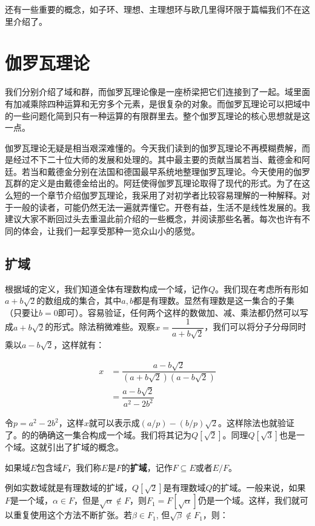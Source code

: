 \documentclass{article}
\begin{document}
还有一些重要的概念，如子环、理想、主理想环与欧几里得环限于篇幅我们不在这里介绍了。

\section{伽罗瓦理论}
我们分别介绍了域和群，而伽罗瓦理论像是一座桥梁把它们连接到了一起。域里面有加减乘除四种运算和无穷多个元素，是很复杂的对象。而伽罗瓦理论可以把域中的一些问题化简到只有一种运算的有限群里去。整个伽罗瓦理论的核心思想就是这一点。

伽罗瓦理论无疑是相当艰深难懂的。今天我们读到的伽罗瓦理论不再模糊费解，而是经过不下二十位大师的发展和处理的。其中最主要的贡献当属若当、戴德金和阿廷。若当和戴德金分别在法国和德国最早系统地整理伽罗瓦理论。今天使用的伽罗瓦群的定义是由戴德金给出的。阿廷使得伽罗瓦理论取得了现代的形式\cite{ZhangPu2013}。为了在这么短的一个章节介绍伽罗瓦理论，我采用了对初学者比较容易理解的一种解释\cite{Stillwell1994}。对于一般的读者，可能仍然无法一遍就弄懂它。开卷有益，生活不是线性发展的。我建议大家不断回过头去重温此前介绍的一些概念，并阅读那些名著。每次也许有不同的体会，让我们一起享受那种一览众山小的感觉。

\subsection{扩域}
根据域的定义，我们知道全体有理数构成一个域，记作$Q$。我们现在考虑所有形如$a + b\sqrt{2}$的数组成的集合，其中$a, b$都是有理数\cite{Goodman2011}。显然有理数是这一集合的子集（只要让$b=0$即可）。容易验证，任何两个这样的数做加、减、乘法都仍然可以写成$a + b \sqrt{2}$的形式。除法稍微难些。观察$x = \dfrac{1}{a + b\sqrt{2}}$，我们可以将分子分母同时乘以$a - b \sqrt{2}$，这样就有：

\[
\begin{array}{rl}
x & = \dfrac{a - b \sqrt{2}}{(a + b \sqrt{2})(a - b \sqrt{2})} \\[2ex]
  & = \dfrac{a - b \sqrt{2}}{a^2 - 2b^2}
\end{array}
\]

令$p = a^2 - 2b^2$，这样$x$就可以表示成$(a/p) -(b/p)\sqrt{2}$。这样除法也就验证了。的的确确这一集合构成一个域。我们将其记为$Q[\sqrt{2}]$。同理$Q[\sqrt{3}]$也是一个域。这就引出了扩域的概念。

\begin{definition}
如果域$E$包含域$F$，我们称$E$是$F$的\textbf{扩域}，记作$F \subseteq E$或者$E/F$。
\end{definition}

例如实数域就是有理数域的扩域，$Q[\sqrt{2}]$是有理数域$Q$的扩域。一般来说，如果$F$是一个域，$\alpha \in F$，但是$\sqrt{\alpha} \not\in F$，则$F_1 = F[\sqrt{\alpha}]$仍是一个域。这样，我们就可以重复使用这个方法不断扩张。若$\beta \in F_1$, 但$\sqrt{\beta} \not\in F_1$，则：
\end{document}
